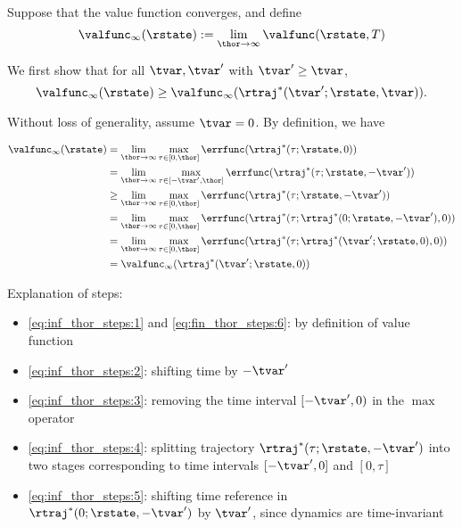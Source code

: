\begin{IEEEproof}
  
  Suppose that the value function converges, and define
  \begin{equation}
  \label{eq:conv_valfunc}
  \valfunc_\infty(\rstate) := \lim_{\thor\rightarrow\infty}\valfunc(\rstate, T)
  \end{equation}
  
  We first show that for all $\tvar, \tvar'$ with $\tvar' \ge \tvar$,
  \begin{equation}
  \label{eq:invariant}
  \valfunc_\infty(\rstate) \ge \valfunc_\infty(\rtraj^*(\tvar'; \rstate, \tvar)).
  \end{equation}
  
  Without loss of generality, assume $\tvar=0$. By definition, we have
  
  \begin{subequations} \label{eq:inf_thor_steps}
    \begin{align}
    \valfunc_\infty(\rstate) & = \lim_{\thor\rightarrow\infty}\max_{\tau \in [0, \thor]} \errfunc(\rtraj^*(\tau; \rstate, 0)) \label{eq:inf_thor_steps:1}\\
    &= \lim_{\thor\rightarrow\infty}\max_{\tau \in [-\tvar', \thor]} \errfunc(\rtraj^*(\tau; \rstate, -\tvar')) \label{eq:inf_thor_steps:2}\\
    &\ge \lim_{\thor\rightarrow\infty}\max_{\tau \in [0, \thor]} \errfunc(\rtraj^*(\tau; \rstate, -\tvar')) \label{eq:inf_thor_steps:3}\\
    & = \lim_{\thor\rightarrow\infty}\max_{\tau \in [0, \thor]} \errfunc(\rtraj^*(\tau; \rtraj^*(0; \rstate, -\tvar'), 0)) \label{eq:inf_thor_steps:4}\\
    & = \lim_{\thor\rightarrow\infty}\max_{\tau \in [0, \thor]} \errfunc(\rtraj^*(\tau; \rtraj^*(\tvar'; \rstate, 0), 0)) \label{eq:inf_thor_steps:5}\\
    & = \valfunc_\infty(\rtraj^*(\tvar'; \rstate, 0)) \label{eq:inf_thor_steps:6}
    \end{align}
  \end{subequations}
  
  Explanation of steps:
  \begin{itemize}
    \item \eqref{eq:inf_thor_steps:1} and \eqref{eq:fin_thor_steps:6}: by definition of value function
    \item \eqref{eq:inf_thor_steps:2}: shifting time by $-\tvar'$
    \item \eqref{eq:inf_thor_steps:3}: removing the time interval $[-\tvar',0)$ in the $\max$ operator
    \item \eqref{eq:inf_thor_steps:4}: splitting trajectory $\rtraj^*(\tau; \rstate, -\tvar')$ into two stages corresponding to time intervals $[-\tvar', 0]$ and $[0, \tau]$
    \item \eqref{eq:inf_thor_steps:5}: shifting time reference in $\rtraj^*(0; \rstate, -\tvar')$ by $\tvar'$, since dynamics are time-invariant
  \end{itemize}
  

\end{IEEEproof}
